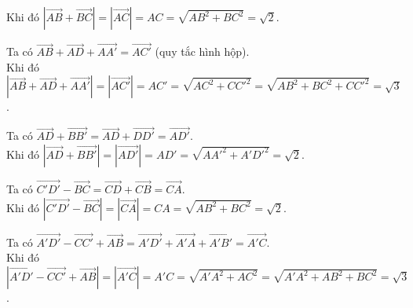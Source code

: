 \begin{bt}[Mức độ 2]
{\begin{listEX}[1]
    Khi đó $\left|\overrightarrow{AB}+\overrightarrow{BC}\right|=\left|\overrightarrow{AC}\right|=AC=\sqrt{AB^2+BC^2}=\sqrt{2}$.
    \item Ta có $\overrightarrow{AB}+\overrightarrow{AD}+\overrightarrow{AA'}=\overrightarrow{AC'}$ (quy tắc hình hộp).\\
    Khi đó $\left|\overrightarrow{AB}+\overrightarrow{AD}+\overrightarrow{AA'}\right|=\left|\overrightarrow{AC'}\right|=AC'=\sqrt{AC^2+CC'^2}=\sqrt{AB^2+BC^2+CC'^2}=\sqrt{3}$.
    \item Ta có $\overrightarrow{AD}+\overrightarrow{BB'}=\overrightarrow{AD}+\overrightarrow{DD'}=\overrightarrow{AD'}$. \\
    Khi đó $\left|\overrightarrow{AD}+\overrightarrow{BB'}\right|=\left|\overrightarrow{AD'}\right|=AD'=\sqrt{AA'^2+A'D'^2}=\sqrt{2}$.
    \item Ta có $\overrightarrow{C'D'}-\overrightarrow{BC}=\overrightarrow{CD}+\overrightarrow{CB}=\overrightarrow{CA}$.\\
    Khi đó $\left|\overrightarrow{C'D'}-\overrightarrow{BC}\right|=\left|\overrightarrow{CA}\right|=CA=\sqrt{AB^2+BC^2}=\sqrt{2}$.
    \item Ta có $\overrightarrow{A'D'}-\overrightarrow{CC'}+\overrightarrow{AB}=\overrightarrow{A'D'}+\overrightarrow{A'A}+\overrightarrow{A'B'}=\overrightarrow{A'C}$.\\
    Khi đó $\left|\overrightarrow{A'D'}-\overrightarrow{CC'}+\overrightarrow{AB}\right|=\left|\overrightarrow{A'C}\right|=A'C=\sqrt{A'A^2+AC^2}=\sqrt{A'A^2+AB^2+BC^2}=\sqrt{3}$.
\end{listEX}
 }
\end{bt}

